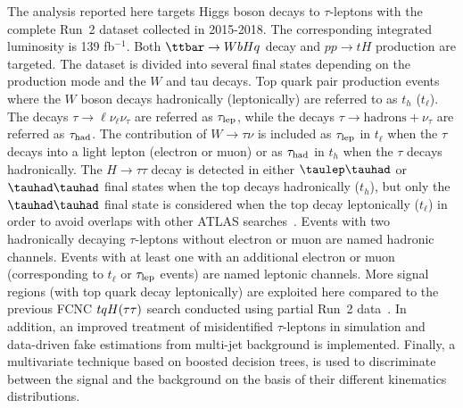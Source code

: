 
The analysis reported here targets Higgs boson decays to 
$\tau$-leptons with the complete Run~2 dataset collected in 2015-2018. The corresponding integrated luminosity is 139 fb$^{-1}$. Both $\ttbar \to WbHq$ decay and $pp \to tH$ production are targeted. The dataset is divided into several final states depending on the production mode and
the  $W$ and tau decays. Top quark pair production events where the $W$ boson decays hadronically (leptonically) are referred to as $t_h$ ($t_{\ell}$).
The decays $\tau \to \ell \nu_{\ell} \nu_{\tau}$ are referred as $\tau_{\mathrm{lep}}$, while the decays $\tau \to \text{hadrons} + \nu_{\tau}$ are referred as $\tau_\text{had}$.
The contribution of 
$W\rightarrow\tau\nu$ is included as $\tau_{\mathrm{lep}}$ in $t_{\ell}$ when the $\tau$ decays into a light lepton (electron or muon) or as $\tau_\text{had}$ 
in $t_h$ when the $\tau$ decays hadronically.
The $H\rightarrow \tau\tau$ decay is detected in
either $\tlhad$ or $\thadhad$ final states when the top decays hadronically ($t_h$), but only the $\thadhad$ final state is considered
when the top decay leptonically ($t_{\ell}$) in order to avoid overlaps with
other ATLAS searches~\cite{Aaboud:2018pob}. 
Events with two hadronically decaying $\tau$-leptons without electron or muon are named hadronic channels. Events with at least one \tauhad with an additional electron or muon (corresponding to $t_{\ell}$ or $\tau_{\mathrm{lep}}$ events) are named leptonic channels. More signal regions (with top quark decay leptonically) are exploited here compared to the previous FCNC $tqH(\tau\tau)$ search conducted using partial Run~2 data~\cite{fcnc36}.
In addition, an improved treatment of misidentified $\tau$-leptons in simulation and data-driven
fake estimations from multi-jet background is implemented.
Finally, a multivariate technique based on boosted decision trees, is used to discriminate between the signal and the background on the basis of their different kinematics distributions. 

